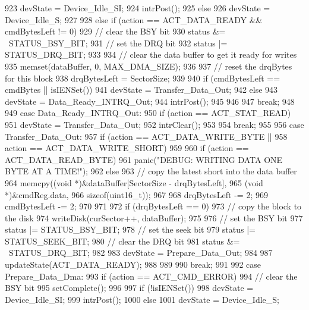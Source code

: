 \begin{DoxyCode}
{{{{923                 devState = Device_Idle_SI;
924                 intrPost();
925             } else {
926                 devState = Device_Idle_S;
927             }
928         } else if (action == ACT_DATA_READY && cmdBytesLeft != 0) {
929             // clear the BSY bit
930             status &= ~STATUS_BSY_BIT;
931             // set the DRQ bit
932             status |= STATUS_DRQ_BIT;
933 
934             // clear the data buffer to get it ready for writes
935             memset(dataBuffer, 0, MAX_DMA_SIZE);
936 
937             // reset the drqBytes for this block
938             drqBytesLeft = SectorSize;
939 
940             if (cmdBytesLeft == cmdBytes || isIENSet()) {
941                 devState = Transfer_Data_Out;
942             } else {
943                 devState = Data_Ready_INTRQ_Out;
944                 intrPost();
945             }
946         }
947         break;
948 
949       case Data_Ready_INTRQ_Out:
950         if (action == ACT_STAT_READ) {
951             devState = Transfer_Data_Out;
952             intrClear();
953         }
954         break;
955 
956       case Transfer_Data_Out:
957         if (action == ACT_DATA_WRITE_BYTE ||
958             action == ACT_DATA_WRITE_SHORT) {
959 
960             if (action == ACT_DATA_READ_BYTE) {
961                 panic("DEBUG: WRITING DATA ONE BYTE AT A TIME!\n");
962             } else {
963                 // copy the latest short into the data buffer
964                 memcpy((void *)&dataBuffer[SectorSize - drqBytesLeft],
965                        (void *)&cmdReg.data,
966                        sizeof(uint16_t));
967 
968                 drqBytesLeft -= 2;
969                 cmdBytesLeft -= 2;
970             }
971 
972             if (drqBytesLeft == 0) {
973                 // copy the block to the disk
974                 writeDisk(curSector++, dataBuffer);
975 
976                 // set the BSY bit
977                 status |= STATUS_BSY_BIT;
978                 // set the seek bit
979                 status |= STATUS_SEEK_BIT;
980                 // clear the DRQ bit
981                 status &= ~STATUS_DRQ_BIT;
982 
983                 devState = Prepare_Data_Out;
984 
987                 updateState(ACT_DATA_READY);
988             }
989         }
990         break;
991 
992       case Prepare_Data_Dma:
993         if (action == ACT_CMD_ERROR) {
994             // clear the BSY bit
995             setComplete();
996 
997             if (!isIENSet()) {
998                 devState = Device_Idle_SI;
999                 intrPost();
1000             } else {
1001                 devState = Device_Idle_S;
}}}}
\end{DoxyCode}
